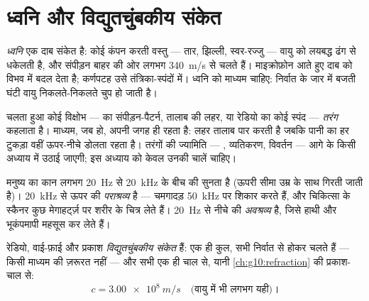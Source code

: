 \section{ध्वनि और विद्युतचुंबकीय संकेत}

\begin{definition}[ध्वनि]\label{def:g10:signals-and-waves:sound}
\emph{ध्वनि} एक दाब संकेत है: कोई कंपन करती
वस्तु --- तार, झिल्ली, स्वर-रज्जु --- वायु को लयबद्ध ढंग से धकेलती है,
और संपीड़न बाहर की ओर लगभग \qty{340}{m/s} से चलते हैं। माइक्रोफ़ोन आते हुए
दाब को विभव में बदल देता है; कर्णपटह उसे तंत्रिका-स्पंदों में।
ध्वनि को माध्यम चाहिए: निर्वात के जार में बजती घंटी वायु निकलते-निकलते
चुप हो जाती है।
\end{definition}

\begin{definition}[तरंग]\label{def:g10:signals-and-waves:wave}
चलता हुआ कोई विक्षोभ ---  का संपीड़न-पैटर्न, तालाब की लहर,
या रेडियो का कोई स्पंद --- \emph{तरंग} कहलाता है। माध्यम, जब
हो, अपनी जगह ही रहता है: लहर तालाब पार करती है जबकि पानी का हर टुकड़ा
वहीं ऊपर-नीचे डोलता रहता है। तरंगों की ज्यामिति --- ,
व्यतिकरण, विवर्तन --- आगे के किसी अध्याय में उठाई जाएगी; इस अध्याय को
केवल उनकी चालें चाहिए।
\end{definition}

\begin{definition}[पराश्रव्य और अवश्रव्य]\label{def:g10:signals-and-waves:ultrasound}
मनुष्य का कान लगभग \qty{20}{Hz} से \qty{20}{kHz} के बीच की  सुनता है
(ऊपरी सीमा उम्र के साथ गिरती जाती है)। \qty{20}{kHz} से ऊपर की 
\emph{पराश्रव्य} है --- चमगादड़ \qty{50}{kHz} पर शिकार करते
हैं, और चिकित्सा के स्कैनर कुछ मेगाहर्ट्ज़ पर शरीर के चित्र लेते हैं।
\qty{20}{Hz} से नीचे की  \emph{अवश्रव्य} है, जिसे
हाथी और भूकंपमापी महसूस कर लेते हैं।
\end{definition}

\begin{proposition}[विद्युतचुंबकीय संकेत]\label{prop:g10:signals-and-waves:em}
रेडियो, वाई-फ़ाई और प्रकाश \emph{विद्युतचुंबकीय
संकेत} हैं: एक ही कुल, सभी निर्वात से होकर
चलते हैं --- किसी माध्यम की ज़रूरत नहीं --- और सभी एक ही चाल से, यानी
\cref{ch:g10:refraction} की प्रकाश-चाल से:
\[
c = \qty{3.00e8}{m/s} \quad \text{(वायु में भी लगभग यही)।}
\]
\end{proposition}
\admitted


